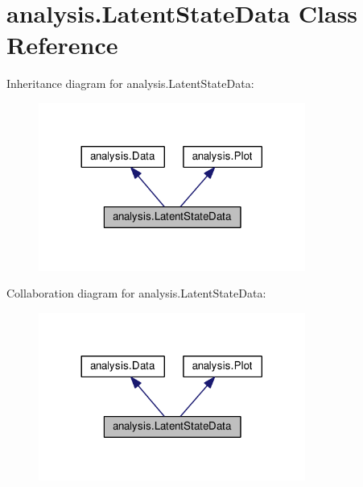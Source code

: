 \hypertarget{classanalysis_1_1LatentStateData}{}\section{analysis.\+Latent\+State\+Data Class Reference}
\label{classanalysis_1_1LatentStateData}


Inheritance diagram for analysis.\+Latent\+State\+Data\+:
\nopagebreak
\begin{figure}[H]
\begin{center}
\leavevmode
\includegraphics[width=248pt]{classanalysis_1_1LatentStateData__inherit__graph}
\end{center}
\end{figure}


Collaboration diagram for analysis.\+Latent\+State\+Data\+:
\nopagebreak
\begin{figure}[H]
\begin{center}
\leavevmode
\includegraphics[width=248pt]{classanalysis_1_1LatentStateData__coll__graph}
\end{center}
\end{figure}

